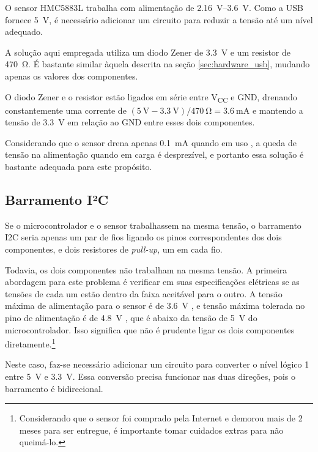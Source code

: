 \documentclass[brazil,pagestart=firstchapter]{abnt}
\newcommand*{\VCC}{V\textsubscript{CC}\xspace}
\newcommand*{\GND}{GND\xspace}
\begin{document}
O sensor HMC5883L trabalha com alimentação de \SIrange{2.16}{3.6}{\volt}.
\cite[p.~2]{HMC5883L} Como a \ac{USB} fornece \SI{5}{\volt}, é necessário
adicionar um circuito para reduzir a tensão até um nível adequado.

A solução aqui empregada utiliza um diodo Zener de \SI{3.3}{\volt} e um
resistor de \SI{470}{\ohm}. \cite{3vtipsandtricks} É bastante similar àquela
descrita na seção \ref{sec:hardware_usb}, mudando apenas os valores dos
componentes.

O diodo Zener e o resistor estão ligados em série entre \VCC e \GND,
drenando constantemente uma corrente de $ (\SI{5}{\volt} - \SI{3.3}{\volt})
/ \SI{470}{\ohm} = \SI{3.6}{\milli\ampere} $ e mantendo a tensão de
\SI{3.3}{\volt} em relação ao \GND entre esses dois componentes.

Considerando que o sensor drena apenas \SI{0.1}{\milli\ampere} quando em
uso \cite[p.~2]{HMC5883L}, a queda de tensão na alimentação quando em carga
é desprezível, e portanto essa solução é bastante adequada para este
propósito.

\subsection{Barramento I²C}
\label{sub:hardware_sensor_i2c}

Se o microcontrolador e o sensor trabalhassem na mesma tensão, o barramento
\ac{I2C} seria apenas um par de fios ligando os pinos correspondentes dos
dois componentes, e dois resistores de \textit{pull-up}, um em cada fio.

Todavia, os dois componentes não trabalham na mesma tensão. A primeira
abordagem para este problema é verificar em suas especificações elétricas se
as tensões de cada um estão dentro da faixa aceitável para o outro.
\cite[p.~9]{AN97055} A tensão máxima de alimentação para o sensor é de
\SI{3.6}{\volt} \cite[p.~2]{HMC5883L}, e tensão máxima tolerada no pino de
alimentação é de \SI{4.8}{\volt} \cite[p.~3]{HMC5883L}, que é abaixo da
tensão de \SI{5}{\volt} do microcontrolador. Isso significa que não é
prudente ligar os dois componentes diretamente.\footnote{
	Considerando que o sensor foi comprado pela Internet e demorou mais de
	2 meses para ser entregue, é importante tomar cuidados extras para não
	queimá-lo.
}

Neste caso, faz-se necessário adicionar um circuito para converter o nível
lógico 1 entre \SI{5}{\volt} e \SI{3.3}{\volt}. Essa conversão precisa
funcionar nas duas direções, pois o barramento é bidirecional.
\end{document}
